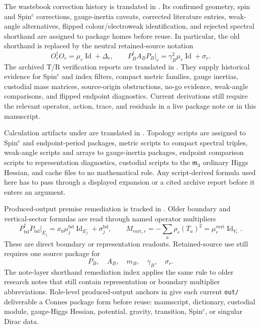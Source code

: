 \documentclass[11pt]{article}
\newcommand{\Id}{\operatorname{Id}}
\newcommand{\mthree}{\mathfrak m_3}
\begin{document}
The wastebook correction history is translated in
\cite{ncg-wastebook-correction}.  Its confirmed geometry, spin and
Spin\({}^c\) corrections, gauge-inertia caveats, corrected literature entries,
weak-angle alternatives, flipped colour/electroweak identification, and
rejected spectral shorthand are assigned to package homes before reuse.  In
particular, the old shorthand is replaced by the neutral retained-source
notation
\[
  O_r^\dagger O_r=\mu_r\Id+\Delta_r,\qquad
  P_B^\dagger A_BP_B\vert_r=\gamma_B^2\mu_r\Id+\sigma_r .
\]
The archived T/R verification reports are translated in
\cite{ncg-archive-verification-ledger}.  They supply historical evidence for
Spin\({}^c\) and index filters, compact metric families, gauge inertias,
custodial mass matrices, source-origin obstructions, no-go evidence,
weak-angle comparisons, and flipped endpoint diagnostics.  Current derivations
still require the relevant operator, action, trace, and residuals in a live
package note or in this manuscript.

Calculation artifacts under  are translated in
\cite{ncg-calculation-artifact-ledger}.  Topology scripts are assigned to
Spin\({}^c\) and endpoint-period packages, metric scripts to compact spectral
triples, weak-angle scripts and arrays to gauge-inertia packages, endpoint
comparison scripts to representation diagnostics, custodial scripts to the
\(\mthree\) ordinary Higgs Hessian, and cache files to no mathematical role.
Any script-derived formula used here has to pass through a displayed expansion
or a cited archive report before it enters an argument.

Produced-output premise remediation is tracked in
\cite{ncg-produced-remediation}.  Older boundary and vertical-sector formulas
are read through named operator multipliers
\[
  P_{\mathrm{bd}}^\dagger P_{\mathrm{bd}}\vert_{E_j}
    = x_0\mu_j^{\mathrm{bd}}\Id_{E_j}+\sigma_j^{\mathrm{bd}},
  \qquad
  M_{\mathrm{vert},r}=-\sum_a\rho_r(T_a)^2
    =\mu_r^{\mathrm{vert}}\Id_{V_r}.
\]
These are direct boundary or representation readouts.  Retained-source use
still requires one source package for
\[
  P_B,\quad A_B,\quad m_B,\quad \gamma_B,\quad \sigma_r .
\]
The note-layer shorthand remediation index
\cite{ncg-note-multiplier-remediation} applies the same rule to older research
notes that still contain representation or boundary multiplier abbreviations.
Role-level produced-output anchors in
\cite{ncg-produced-deliverable-anchors} give each current \texttt{out/}
deliverable a Connes package form before reuse: manuscript, dictionary,
custodial module, gauge-Higgs Hessian, potential, gravity, transition,
Spin\({}^c\), or singular Dirac data.
\end{document}
